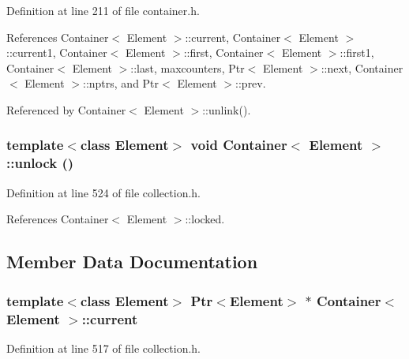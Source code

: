 Definition at line 211 of file container.h.

References Container$<$ Element $>$::current, Container$<$ Element $>$::current1, Container$<$ Element $>$::first, Container$<$ Element $>$::first1, Container$<$ Element $>$::last, maxcounters, Ptr$<$ Element $>$::next, Container$<$ Element $>$::nptrs, and Ptr$<$ Element $>$::prev.

Referenced by Container$<$ Element $>$::unlink().\hypertarget{classContainer_a3bae4d6afd5eddb5a5a4488c8c1f260}{
\subsubsection[{unlock}]{\setlength{\rightskip}{0pt plus 5cm}template$<$class Element$>$ void {\bf Container}$<$ Element $>$::unlock ()}}
\label{classContainer_a3bae4d6afd5eddb5a5a4488c8c1f260}




Definition at line 524 of file collection.h.

References Container$<$ Element $>$::locked.

\subsection{Member Data Documentation}
\hypertarget{classContainer_c9071a45e026493a71943b7ffa747282}{
\subsubsection[{current}]{\setlength{\rightskip}{0pt plus 5cm}template$<$class Element$>$ {\bf Ptr}$<$Element$>$ $\ast$ {\bf Container}$<$ Element $>$::{\bf current}}}
\label{classContainer_c9071a45e026493a71943b7ffa747282}




Definition at line 517 of file collection.h.

